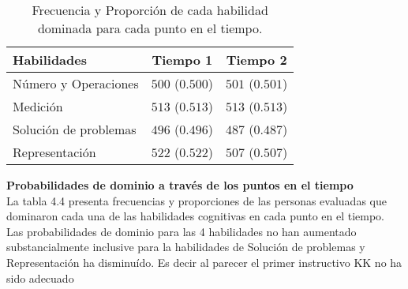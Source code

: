 \begin{table}[H]
	\centering
	\caption{Frecuencia y Proporción de cada habilidad dominada para cada punto en el tiempo.}
	\begin{tabular}{lrr}
		\hline
		Habilidades & \multicolumn{1}{c}{Tiempo 1} & \multicolumn{1}{c}{Tiempo 2}\\
		\hline
		Número y Operaciones 	& $500$ ($0.500$)  & $501$ ($0.501$) \\
		Medición 		& $513$ ($0.513$)  & $513$ ($0.513$) \\
		Solución de problemas		& $496$ ($ 0.496$) & $487$ ($0.487$)\\
		Representación 		& $522$ ($0.522$) & $507$ ($0.507$) \\
		\hline
	\end{tabular}
\end{table}

\noindent
\textbf{Probabilidades de dominio a través de los puntos en el tiempo}\\
La tabla 4.4 presenta frecuencias y proporciones de las personas evaluadas que dominaron cada una de las habilidades cognitivas en cada punto en el tiempo. Las probabilidades de dominio para las 4 habilidades no han aumentado substancialmente inclusive para la habilidades de Solución de problemas y Representación ha disminuído. Es decir al parecer el primer instructivo KK no ha sido adecuado   

